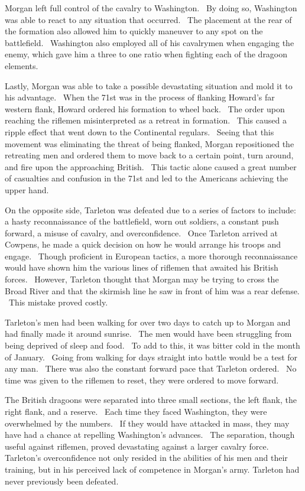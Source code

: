 Morgan left full control of the cavalry to Washington.  By doing so, Washington
was able to react to any situation that occurred.  The placement at the rear of
the formation also allowed him to quickly maneuver to any spot on the
battlefield.  Washington also employed all of his cavalrymen when engaging the
enemy, which gave him a three to one ratio when fighting each of the dragoon
elements.      

Lastly, Morgan was able to take a possible devastating situation and mold it to
his advantage.  When the 71st was in the process of flanking Howard’s far
western flank, Howard ordered his formation to wheel back.  The order upon
reaching the riflemen misinterpreted as a retreat in formation.  This caused a
ripple effect that went down to the Continental regulars.  Seeing that this
movement was eliminating the threat of being flanked, Morgan repositioned the
retreating men and ordered them to move back to a certain point, turn around,
and fire upon the approaching British.  This tactic alone caused a great number
of casualties and confusion in the 71st and led to the Americans achieving the
upper hand.  

On the opposite side, Tarleton was defeated due to a series of factors to
include: a hasty reconnaissance of the battlefield, worn out soldiers, a
constant push forward, a misuse of cavalry, and overconfidence.  Once Tarleton
arrived at Cowpens, he made a quick decision on how he would arrange his troops
and engage.  Though proficient in European tactics, a more thorough
reconnaissance would have shown him the various lines of riflemen that awaited
his British forces.  However, Tarleton thought that Morgan may be trying to
cross the Broad River and that the skirmish line he saw in front of him was a
rear defense.  This mistake proved costly.

Tarleton’s men had been walking for over two days to catch up to Morgan and had
finally made it around sunrise.  The men would have been struggling from being
deprived of sleep and food.  To add to this, it was bitter cold in the month of
January.  Going from walking for days straight into battle would be a test for
any man.  There was also the constant forward pace that Tarleton ordered.  No
time was given to the riflemen to reset, they were ordered to move forward.  

The British dragoons were separated into three small sections, the left flank,
the right flank, and a reserve.  Each time they faced Washington, they were
overwhelmed by the numbers.  If they would have attacked in mass, they may have
had a chance at repelling Washington’s advances.  The separation, though useful
against riflemen, proved devastating against a larger cavalry force. Tarleton’s
overconfidence not only resided in the abilities of his men and their training,
but in his perceived lack of competence in Morgan’s army.  Tarleton had never
previously been defeated.

